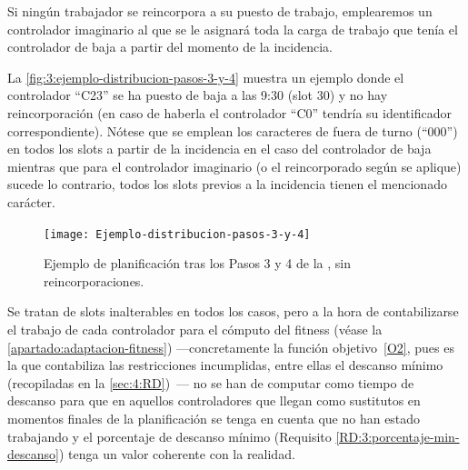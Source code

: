 Si ningún trabajador se reincorpora a su puesto de trabajo, emplearemos un controlador imaginario al que se le asignará toda la carga de trabajo que tenía el controlador de baja a partir del momento de la incidencia.

La \autoref{fig:3:ejemplo-distribucion-pasos-3-y-4} muestra un ejemplo donde el controlador ``C23'' se ha puesto de baja a las 9:30 (slot 30) y no hay reincorporación (en caso de haberla el controlador ``C0'' tendría su identificador correspondiente). Nótese que se emplean los caracteres de fuera de turno (``000'') en todos los slots a partir de la incidencia en el caso del controlador de baja mientras que para el controlador imaginario (o el reincorporado según se aplique) sucede lo contrario, todos los slots previos a la incidencia tienen el mencionado carácter. 

\begin{figure}
	\centering
	\texttt{[image: Ejemplo-distribucion-pasos-3-y-4]}
	\caption[Ejemplo de planificación tras los pasos 3 y 4 de la \faseuno{}]{Ejemplo de planificación tras los Pasos 3 y 4 de la \faseuno{}, sin reincorporaciones.}
	\label{fig:3:ejemplo-distribucion-pasos-3-y-4}
\end{figure}

Se tratan de slots inalterables en todos los casos, pero a la hora de contabilizarse el trabajo de cada controlador para el cómputo del fitness (véase la \autoref{apartado:adaptacion-fitness}) ---concretamente la función objetivo~\ref{O2}, pues es la que contabiliza las restricciones incumplidas, entre ellas el descanso mínimo (recopiladas en la \autoref{sec:4:RD})~--- no se han de computar como tiempo de descanso para que en aquellos controladores que llegan como sustitutos en momentos finales de la planificación se tenga en cuenta que no han estado trabajando y el porcentaje de descanso mínimo (Requisito \ref{RD:3:porcentaje-min-descanso}) tenga un valor coherente con la realidad.
%
%
%